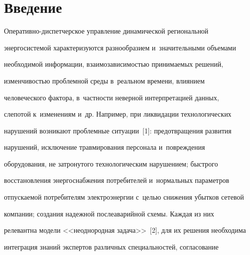       \thispagestyle{headings}


      




     


     \vspace*{-18pt}





  


\section{Введение}





\vspace*{-4pt}





  Оперативно-диспетчерское управление динамической региональной 


энергосистемой характеризуются разнообразием и~значительными объемами 


необходимой информации, взаимозависимостью принимаемых решений, 


из\-мен\-чи\-востью проблемной среды в~реальном времени, влиянием 


человеческого фактора, в~частности неверной интерпретацией данных, 


слепотой к~изменениям и~др. Например, при ликвидации технологических 


нарушений возникают проблемные ситуации~[1]: предотвращения развития 


нарушений, исключение травмирования персонала и~повреждения 


оборудования, не затронутого технологическим нарушением; быстрого 


восстановления энергоснабжения потребителей и~нормальных параметров 


отпускаемой потребителям электроэнергии с~целью снижения убытков сетевой 


компании; создания надежной послеаварийной схемы. Каждая из них 


релевантна модели <<неоднородная задача>>~[2], для их решения необходима 


интеграция знаний экспертов различных специальностей, согласование 


